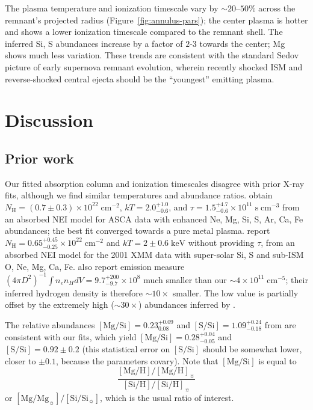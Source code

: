 \documentclass[preprint2,tighten,trackchanges]{aastex6}
\newcommand*{\mt}{\mathrm}
\newcommand*{\unit}[1]{\;\mt{#1}}  %
\newcommand*{\abt}{\mathord{\sim}} %
\newcommand*{\nH}{N_{\mathrm{H}}}
\newcommand*{\nHUnits}{\times 10^{22} \unit{cm^{-2}}}
\newcommand*{\kB}{k}  %
\begin{document}
The plasma temperature and ionization timescale vary by $\abt 20$--$50\%$
across the remnant's projected radius (Figure~\ref{fig:annulus-pars});
the center plasma is hotter and shows a lower ionization timescale compared to
the remnant shell.
The inferred Si, S abundances increase by a factor of $2$-$3$ towards the
center; Mg shows much less variation.
These trends are consistent with the standard Sedov picture of early supernova
remnant evolution, wherein recently shocked ISM and reverse-shocked central
ejecta should be the ``youngest'' emitting plasma.


\section{Discussion} \label{sec:disc}

\subsection{Prior work}

Our fitted absorption column and ionization timescales disagree with prior
X-ray fits, although we find similar temperatures and abundance ratios.
\citet{rakowski2001} obtain $\nH = (0.7 \pm 0.3) \nHUnits$,
$\kB T = 2.0^{+1.0}_{-0.6}$, and
$\tau = 1.5^{+4.7}_{-0.6} \times 10^{11} \unit{s\;cm^{-3}}$
from an absorbed NEI model for ASCA data with enhanced Ne, Mg, Si, S, Ar, Ca,
Fe abundances; the best fit converged towards a pure metal plasma.
\citet{safi-harb2007} report $\nH = 0.65^{+0.45}_{-0.25} \nHUnits$
and $\kB T = 2 \pm 0.6 \unit{keV}$ without providing $\tau$, from
an absorbed NEI model for the 2001 XMM data with
super-solar Si, S and sub-ISM O, Ne, Mg, Ca, Fe.
\citet{rakowski2001} also report emission measure
$(4\pi D^2)^{-1} \int n_e n_H dV = 9.7^{+200}_{-9.7} \times 10^8$ much smaller
than our $\abt 4 \times 10^{11} \unit{cm^{-5}}$; their inferred hydrogen
density is therefore $\abt 10\times$ smaller.
The low value is partially offset by the extremely high ($\abt 30\times$)
abundances inferred by \citet{rakowski2001}.

The relative abundances
  $[\mt{Mg}/\mt{Si}] = 0.23^{+0.09}_{0.08}$ and
  $[\mt{S}/\mt{Si}] = 1.09^{+0.24}_{-0.18}$ from \citet{rakowski2001}
are consistent with our fits, which yield $[\mt{Mg}/\mt{Si}] = 0.28^{+0.04}_{-0.05}$
and $[\mt{S}/\mt{Si}] = 0.92 \pm 0.2$ (this statistical error on
$[\mt{S}/\mt{Si}]$ should be somewhat lower, closer to $\pm 0.1$, because the
parameters covary).
Note that $[\mt{Mg}/\mt{Si}]$ is equal to
\[
    \frac{[\mt{Mg}/\mt{H}] / [\mt{Mg}/\mt{H}]_{\sun}}
         {[\mt{Si}/\mt{H}] / [\mt{Si}/\mt{H}]_{\sun}}
\]
or $[\mt{Mg}/\mt{Mg}_{\sun}] / [\mt{Si}/\mt{Si}_{\sun}]$,
which is the usual ratio of interest.
\end{document}
